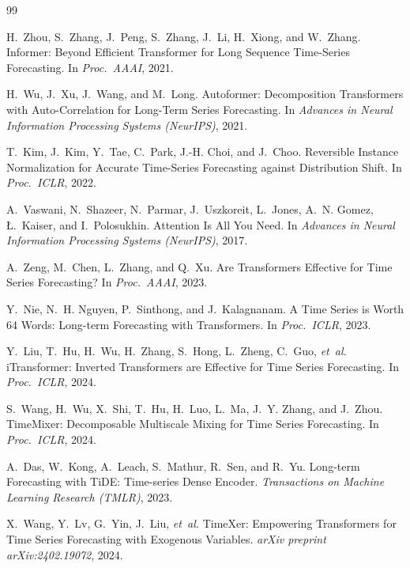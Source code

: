 \documentclass{ieeeaccess}
\begin{document}
\begin{thebibliography}{99}

H.~Zhou, S.~Zhang, J.~Peng, S.~Zhang, J.~Li, H.~Xiong, and W.~Zhang.
\newblock Informer: Beyond Efficient Transformer for Long Sequence Time-Series
Forecasting.
\newblock In \emph{Proc.\ AAAI}, 2021.

H.~Wu, J.~Xu, J.~Wang, and M.~Long.
\newblock Autoformer: Decomposition Transformers with Auto-Correlation for Long-Term
Series Forecasting.
\newblock In \emph{Advances in Neural Information Processing Systems (NeurIPS)}, 2021.

T.~Kim, J.~Kim, Y.~Tae, C.~Park, J.-H. Choi, and J.~Choo.
\newblock Reversible Instance Normalization for Accurate Time-Series Forecasting
against Distribution Shift.
\newblock In \emph{Proc.\ ICLR}, 2022.

A.~Vaswani, N.~Shazeer, N.~Parmar, J.~Uszkoreit, L.~Jones, A.~N. Gomez,
\L{}.~Kaiser, and I.~Polosukhin.
\newblock Attention Is All You Need.
\newblock In \emph{Advances in Neural Information Processing Systems (NeurIPS)}, 2017.

A.~Zeng, M.~Chen, L.~Zhang, and Q.~Xu.
\newblock Are Transformers Effective for Time Series Forecasting?
\newblock In \emph{Proc.\ AAAI}, 2023.

Y.~Nie, N.~H. Nguyen, P.~Sinthong, and J.~Kalagnanam.
\newblock A Time Series is Worth 64 Words: Long-term Forecasting with Transformers.
\newblock In \emph{Proc.\ ICLR}, 2023.

Y.~Liu, T.~Hu, H.~Wu, H.~Zhang, S.~Hong, L.~Zheng, C.~Guo, \emph{et~al.}
\newblock iTransformer: Inverted Transformers are Effective for Time Series
Forecasting.
\newblock In \emph{Proc.\ ICLR}, 2024.

S.~Wang, H.~Wu, X.~Shi, T.~Hu, H.~Luo, L.~Ma, J.~Y. Zhang, and J.~Zhou.
\newblock TimeMixer: Decomposable Multiscale Mixing for Time Series Forecasting.
\newblock In \emph{Proc.\ ICLR}, 2024.

A.~Das, W.~Kong, A.~Leach, S.~Mathur, R.~Sen, and R.~Yu.
\newblock Long-term Forecasting with TiDE: Time-series Dense Encoder.
\newblock \emph{Transactions on Machine Learning Research (TMLR)}, 2023.

X.~Wang, Y.~Lv, G.~Yin, J.~Liu, \emph{et~al.}
\newblock TimeXer: Empowering Transformers for Time Series Forecasting with Exogenous
Variables.
\newblock \emph{arXiv preprint arXiv:2402.19072}, 2024.


\end{thebibliography}
\end{document}

